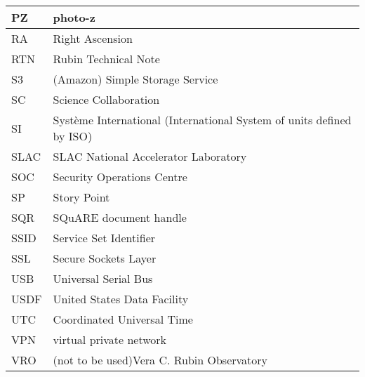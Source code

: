 \begin{longtable}{p{}p{}}
PZ & photo-z \\\hline
RA & Right Ascension \\\hline
RTN & Rubin Technical Note \\\hline
S3 & (Amazon) Simple Storage Service \\\hline
SC & Science Collaboration \\\hline
SI & Syst\`eme International (International System of units defined by ISO) \\\hline
SLAC & SLAC National Accelerator Laboratory \\\hline
SOC & Security Operations Centre \\\hline
SP & Story Point \\\hline
SQR & SQuARE document handle \\\hline
SSID & Service Set Identifier \\\hline
SSL & Secure Sockets Layer \\\hline
USB & Universal Serial Bus \\\hline
USDF & United States Data Facility \\\hline
UTC & Coordinated Universal Time \\\hline
VPN & virtual private network \\\hline
VRO & (not to be used)Vera C. Rubin Observatory \\\hline
\end{longtable}
